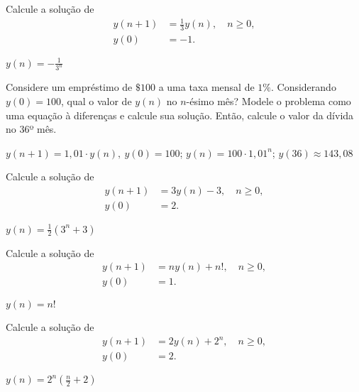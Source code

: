 \begin{exer}
  Calcule a solução de
  \begin{align}
    y(n+1) &= \frac{1}{3}y(n),\quad n\geq 0,\\
    y(0) &= -1.
  \end{align}
\end{exer}
\begin{resp}
  $y(n) = -\frac{1}{3^n}$
\end{resp}

\begin{exer}
  Considere um empréstimo de $\$ 100$ a uma taxa mensal de $1\%$. Considerando $y(0)=100$, qual o valor de $y(n)$ no $n$-ésimo mês? Modele o problema como uma equação à diferenças e calcule sua solução. Então, calcule o valor da dívida no 36º mês.
\end{exer}
\begin{resp}
  $y(n+1)=1,01\cdot y(n),~y(0)=100$; $y(n)=100\cdot 1,01^n$; $y(36)\approx 143,08$
\end{resp}

\begin{exer}
  Calcule a solução de
  \begin{align}
    y(n+1) &= 3y(n) -3,\quad n\geq 0,\\
    y(0) &= 2.
  \end{align}
\end{exer}
\begin{resp}
  $y(n) = \frac{1}{2}(3^n+3)$
\end{resp}

\begin{exer}
  Calcule a solução de
  \begin{align}
    y(n+1) &= ny(n)+n!,\quad n\geq 0,\\
    y(0) &= 1.
  \end{align}
\end{exer}
\begin{resp}
  $y(n)=n!$
\end{resp}

\begin{exer}
  Calcule a solução de
  \begin{align}
    y(n+1) &= 2y(n)+2^n,\quad n\geq 0,\\
    y(0) &= 2.
  \end{align}
\end{exer}
\begin{resp}
  $\displaystyle y(n)=2^n\left(\frac{n}{2}+2\right)$
\end{resp}

